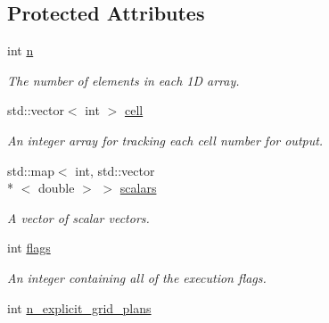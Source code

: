 \subsection*{Protected Attributes}
\begin{DoxyCompactItemize}
\item 
\hypertarget{classelement_1_1element__1_d_a095b85e608191fa8d5f2dd9db5605be4}{int \hyperlink{classelement_1_1element__1_d_a095b85e608191fa8d5f2dd9db5605be4}{n}}\label{classelement_1_1element__1_d_a095b85e608191fa8d5f2dd9db5605be4}

\begin{DoxyCompactList}\small\item\em The number of elements in each 1\-D array. \end{DoxyCompactList}\item 
\hypertarget{classelement_1_1element__1_d_a257ec8aecbd4b121665cee748abf142a}{std\-::vector$<$ int $>$ \hyperlink{classelement_1_1element__1_d_a257ec8aecbd4b121665cee748abf142a}{cell}}\label{classelement_1_1element__1_d_a257ec8aecbd4b121665cee748abf142a}

\begin{DoxyCompactList}\small\item\em An integer array for tracking each cell number for output. \end{DoxyCompactList}\item 
\hypertarget{classelement_1_1element__1_d_a8d962f87ea3deefa7dc5b968b66d34c7}{std\-::map$<$ int, std\-::vector\\*
$<$ double $>$ $>$ \hyperlink{classelement_1_1element__1_d_a8d962f87ea3deefa7dc5b968b66d34c7}{scalars}}\label{classelement_1_1element__1_d_a8d962f87ea3deefa7dc5b968b66d34c7}

\begin{DoxyCompactList}\small\item\em A vector of scalar vectors. \end{DoxyCompactList}\item 
\hypertarget{classelement_1_1element_a018a50e33f8c282b5672b7b5c0ba8f53}{int \hyperlink{classelement_1_1element_a018a50e33f8c282b5672b7b5c0ba8f53}{flags}}\label{classelement_1_1element_a018a50e33f8c282b5672b7b5c0ba8f53}

\begin{DoxyCompactList}\small\item\em An integer containing all of the execution flags. \end{DoxyCompactList}\item 
\hypertarget{classelement_1_1element_a7c21ff2cc068eb5c612c467f43d2dad9}{int \hyperlink{classelement_1_1element_a7c21ff2cc068eb5c612c467f43d2dad9}{n\-\_\-explicit\-\_\-grid\-\_\-plans}}\label{classelement_1_1element_a7c21ff2cc068eb5c612c467f43d2dad9}


\end{DoxyCompactItemize}
